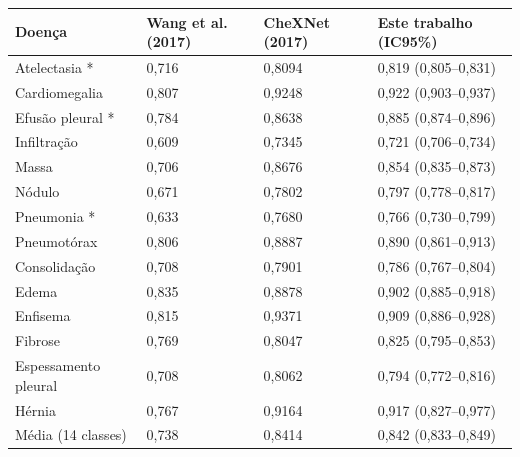 \begin{tabular}{llll}
\toprule
Doença & Wang et al. (2017) & CheXNet (2017) & Este trabalho (IC95\%) \\
\midrule
Atelectasia * & 0,716 & 0,8094 & 0,819 (0,805–0,831) \\
Cardiomegalia & 0,807 & 0,9248 & 0,922 (0,903–0,937) \\
Efusão pleural * & 0,784 & 0,8638 & 0,885 (0,874–0,896) \\
Infiltração & 0,609 & 0,7345 & 0,721 (0,706–0,734) \\
Massa & 0,706 & 0,8676 & 0,854 (0,835–0,873) \\
Nódulo & 0,671 & 0,7802 & 0,797 (0,778–0,817) \\
Pneumonia * & 0,633 & 0,7680 & 0,766 (0,730–0,799) \\
Pneumotórax & 0,806 & 0,8887 & 0,890 (0,861–0,913) \\
Consolidação & 0,708 & 0,7901 & 0,786 (0,767–0,804) \\
Edema & 0,835 & 0,8878 & 0,902 (0,885–0,918) \\
Enfisema & 0,815 & 0,9371 & 0,909 (0,886–0,928) \\
Fibrose & 0,769 & 0,8047 & 0,825 (0,795–0,853) \\
Espessamento pleural & 0,708 & 0,8062 & 0,794 (0,772–0,816) \\
Hérnia & 0,767 & 0,9164 & 0,917 (0,827–0,977) \\
Média (14 classes) & 0,738 & 0,8414 & 0,842 (0,833–0,849) \\
\bottomrule
\end{tabular}
